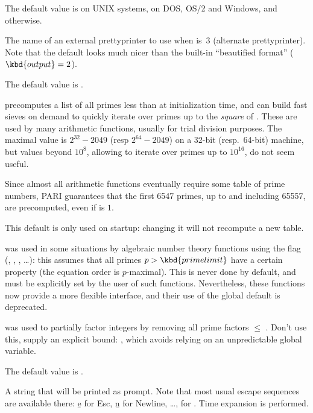 The default value is  on UNIX systems,
 on DOS, OS/2 and Windows, and  otherwise.

\label{se:def,prettyprinter}
The name of an external prettyprinter to use when
 is~3 (alternate prettyprinter). Note that the default
 looks much nicer than the built-in ``beautified
format'' ($\kbd{output} = 2$).

The default value is .

\label{se:def,primelimit}
 precomputes a list of
all primes less than  at initialization time, and can build
fast sieves on demand to quickly iterate over primes up to the \emph{square}
of . These are used by many arithmetic functions, usually for
trial division purposes. The maximal value is $2^{32} - 2049$ (resp $2^{64} -
2049$) on a 32-bit (resp.~64-bit) machine, but values beyond $10^8$,
allowing to iterate over primes up to $10^{16}$, do not seem useful.

Since almost all arithmetic functions eventually require some table of prime
numbers, PARI guarantees that the first 6547 primes, up to and
including 65557, are precomputed, even if  is $1$.

This default is only used on startup: changing it will not recompute a new
table.

  was used in some
situations by algebraic number theory functions using the
 flag (, , , \dots):
this assumes that all primes $p > \kbd{primelimit}$ have a certain
property (the equation order is $p$-maximal). This is never done by default,
and must be explicitly set by the user of such functions. Nevertheless,
these functions now provide a more flexible interface, and their use
of the global default  is deprecated.

  was used to partially
factor integers by removing all prime factors $\leq$ .
Don't use this, supply an explicit bound: ,
which avoids relying on an unpredictable global variable.

The default value is .

\label{se:def,prompt}
A string that will be printed as
prompt. Note that most usual escape sequences are available there: \b{e} for
Esc, \b{n} for Newline, \dots, \kbd{\bs\bs} for \kbd{\bs}. Time expansion is
performed.

